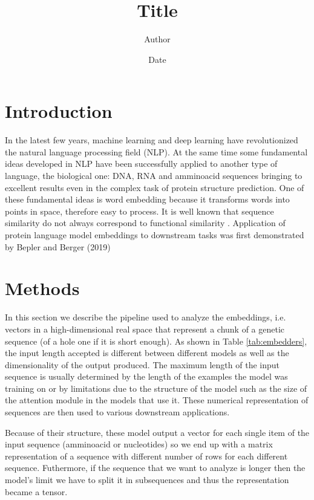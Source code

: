 \documentclass[12pt, letterpaper, twocolumn]{article}
\title{Title}
\author{Author}
\date{Date}
\begin{document}
\maketitle


\section{Introduction}
In the latest few years, machine learning and deep learning have revolutionized the natural language processing field (NLP)\cite{khurana2023natural}. At the same time some fundamental ideas developed in NLP have been successfully applied to another type of language, the biological one: DNA, RNA and amminoacid sequences bringing to excellent results even in the complex task of protein structure prediction\cite{jumper2021highly, lin2022language}. One of these fundamental ideas is word embedding \cite{mikolov2013efficient} because it transforms words into points in space, therefore easy to process.
It is well known that sequence similarity do not always correspond to functional similarity \cite{kosloff2008sequence}.
Application of protein language model embeddings to downstream tasks was first demonstrated by Bepler and Berger (2019) \cite{bepler2019learning}

\section{Methods}

In this section we describe the pipeline used to analyze the embeddings, i.e. vectors in a high-dimensional real space that represent a chunk of a genetic sequence (of a hole one if it is short enough). As shown in Table \ref{tab:embedders}, the input length accepted is different between different models as well as the dimensionality of the output produced. The maximum length of the input sequence is usually determined by the length of the examples the model was training on or by limitations due to the structure of the model such as the size of the attention module in the models that use it. These numerical representation of sequences are then used to various downstream applications.

Because of their structure, these model output a vector for each single item of the input sequence (amminoacid or nucleotides) so we end up with a matrix representation of a sequence with different number of rows for each different sequence. Futhermore, if the sequence that we want to analyze is longer then the model's limit we have to split it in subsequences and thus the representation became a tensor. 
\end{document}
